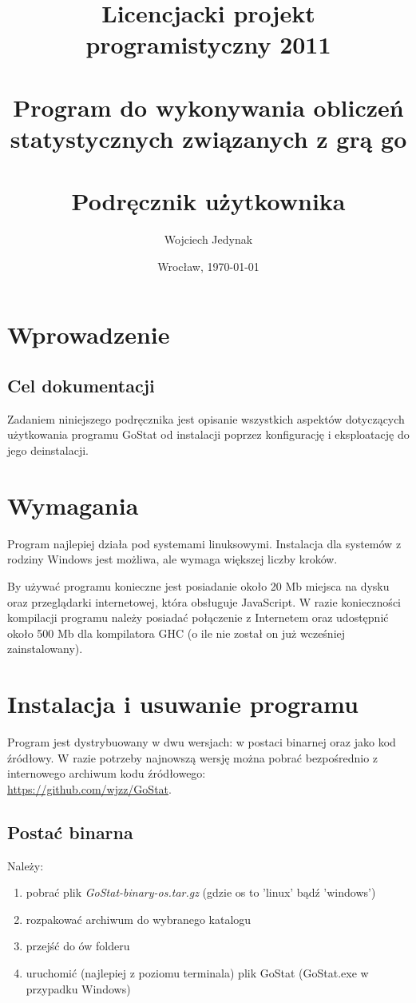 \documentclass[10pt,leqno]{article}
\title{\LARGE Licencjacki projekt programistyczny 2011 \\ 
       \ \\
       Program do wykonywania obliczeń statystycznych związanych z grą go \\ 
       \ \\
       Podręcznik użytkownika }
\author{Wojciech Jedynak}
\date{Wrocław, \today}
\begin{document}
\maketitle 

\thispagestyle{empty}
\tableofcontents

\newpage

\section{Wprowadzenie}

\subsection{Cel dokumentacji}
Zadaniem niniejszego podręcznika jest opisanie wszystkich aspektów dotyczących użytkowania programu GoStat od instalacji poprzez konfigurację
i eksploatację do jego deinstalacji.

\section{Wymagania}
Program najlepiej działa pod systemami linuksowymi. Instalacja dla systemów z rodziny Windows jest możliwa, ale wymaga większej liczby kroków. 

By używać programu konieczne jest posiadanie około 20 Mb miejsca na dysku oraz przeglądarki internetowej, która obsługuje JavaScript. 
W razie konieczności kompilacji programu należy posiadać połączenie z Internetem oraz udostępnić około 500 Mb dla kompilatora GHC (o ile nie 
został on już wcześniej zainstalowany).

\newpage

\section{Instalacja i usuwanie programu}
Program jest dystrybuowany w dwu wersjach: w postaci binarnej oraz jako kod źródłowy. W razie potrzeby najnowszą wersję można 
pobrać bezpośrednio z internowego archiwum kodu źródłowego: \\ 
\url{https://github.com/wjzz/GoStat}.

\subsection{Postać binarna}
Należy: 
\begin{enumerate}
\item pobrać plik \emph{GoStat-binary-os.tar.gz} (gdzie os to 'linux' bądź 'windows')
\item rozpakować archiwum do wybranego katalogu
\item przejść do ów folderu
\item uruchomić (najlepiej z poziomu terminala) plik GoStat (GoStat.exe w przypadku Windows)
\end{enumerate}
\end{document}

